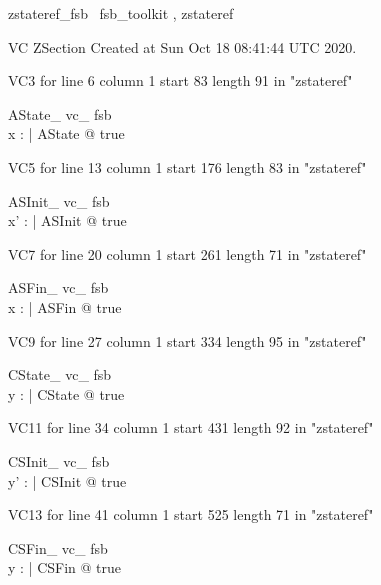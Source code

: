 \documentclass{article}
\begin{document}

\begin{zsection}	 \SECTION zstateref\_fsb \parents~fsb\_toolkit , zstateref
\end{zsection}

VC ZSection Created at Sun Oct 18 08:41:44 UTC 2020.

VC3 for line 6 column 1 start 83 length 91 in "zstateref"
\begin{theorem}{ AState\_ vc\_ fsb}\\
 \exists x : \power \nat | AState @ true \\

\end{theorem}

VC5 for line 13 column 1 start 176 length 83 in "zstateref"
\begin{theorem}{ ASInit\_ vc\_ fsb}\\
 \exists x' : \power \nat | ASInit @ true \\

\end{theorem}

VC7 for line 20 column 1 start 261 length 71 in "zstateref"
\begin{theorem}{ ASFin\_ vc\_ fsb}\\
 \exists x : \power \nat | ASFin @ true \\

\end{theorem}

VC9 for line 27 column 1 start 334 length 95 in "zstateref"
\begin{theorem}{ CState\_ vc\_ fsb}\\
 \exists y : \seq \nat | CState @ true \\

\end{theorem}

VC11 for line 34 column 1 start 431 length 92 in "zstateref"
\begin{theorem}{ CSInit\_ vc\_ fsb}\\
 \exists y' : \seq \nat | CSInit @ true \\

\end{theorem}

VC13 for line 41 column 1 start 525 length 71 in "zstateref"
\begin{theorem}{ CSFin\_ vc\_ fsb}\\
 \exists y : \seq \nat | CSFin @ true \\

\end{theorem}
\end{document}
